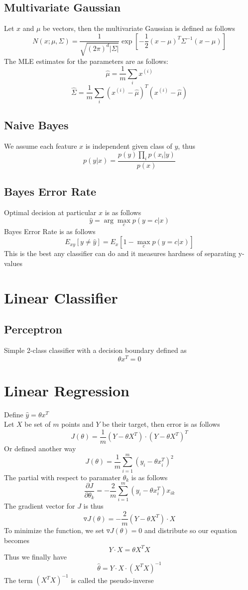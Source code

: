 \documentclass[twoside,11pt]{article}
\theoremstyle{definition}
\begin{document}
\subsection{Multivariate Gaussian}

Let $x$ and $\mu$ be vectors, then the multivariate Gaussian is defined as follows
\[
N(x; \mu, \Sigma) = \frac{1}{\sqrt{(2 \pi)^d |\Sigma|} } \exp[ -\frac{1}{2} (x-\mu)^T \Sigma^{-1} (x-\mu) ]
\]
The MLE estimates for the parameters are as follows: 
\[
\hat{\mu} = \frac{1}{m} \sum_i x^{(i)}
\]
\[
\hat{\Sigma} = \frac{1}{m} \sum_i (x^{(i)}-\hat{\mu})^T(x^{(i)}-\hat{\mu})
\]

\subsection{Naive Bayes}

We assume each feature $x$ is independent given class of $y$, thus 
\[
p(y|x) = \frac{p(y)\prod_i p(x_i|y)}{p(x)}
\]

\subsection{Bayes Error Rate}

Optimal decision at particular $x$ is as follows
\[
\hat{y} = \arg \max_c p(y=c|x)
\]
Bayes Error Rate is as follows
\[
E_{xy} [y \neq \hat{y} ] = E_x [1 - \max_c p(y=c | x) ]
\]
This is the best any classifier can do and it measures hardness of separating y-values
\newpage

\section{Linear Classifier}

\subsection{Perceptron}
Simple 2-class classifier with a decision boundary defined as
\[
\theta x^T = 0
\]

\newpage
\section{Linear Regression}

Define $\hat{y} = \theta x^T$\\
Let $X$ be set of $m$ points and $Y$ be their target, then error is as follows
\[
J(\theta) = \frac{1}{m} (Y - \theta X^T) \cdot (Y- \theta X^T)^T
\]
Or defined another way
\[
J(\theta) = \frac{1}{m} \sum_{i=1}^m (y_i - \theta x_i^T)^2
\]
The partial with respect to paramater $\theta_k$ is as follows
\[
\frac{\partial J}{\partial \theta_k} = -\frac{2}{m} \sum_{i=1}^m (y_i - \theta x_i^T)x_{ik}
\]
The gradient vector for $J$ is thus
\[
\triangledown J(\theta) = -\frac{2}{m} (Y-\theta X^T) \cdot X
\]
To minimize the function, we set $\triangledown J(\theta) = 0$ and distribute so our equation becomes
\[
Y \cdot X = \theta X^T X
\]
Thus we finally have
\[
\hat{\theta} = Y \cdot X \cdot (X^T X)^{-1}
\]
The term $(X^T X)^{-1}$ is called the pseudo-inverse
\end{document}
